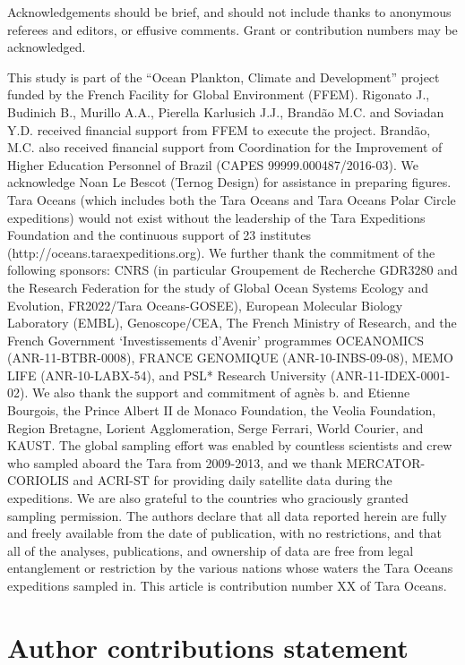 \documentclass[fleqn,10pt]{wlscirep}
\begin{document}
Acknowledgements should be brief, and should not include thanks to anonymous referees and editors, or effusive comments. Grant or contribution numbers may be acknowledged.

This study is part of the “Ocean Plankton, Climate and Development” project funded by the French Facility for Global Environment (FFEM). Rigonato J., Budinich B., Murillo A.A., Pierella Karlusich J.J., Brandão M.C. and Soviadan Y.D. received financial support from FFEM to execute the project. Brandão, M.C. also received financial support from Coordination for the Improvement of Higher Education Personnel of Brazil (CAPES 99999.000487/2016-03). We acknowledge Noan Le Bescot (Ternog Design) for assistance in preparing figures. Tara Oceans (which includes both the Tara Oceans and Tara Oceans Polar Circle expeditions) would not exist without the leadership of the Tara Expeditions Foundation and the continuous support of 23 institutes (http://oceans.taraexpeditions.org). We further thank the commitment of the following sponsors: CNRS (in particular Groupement de Recherche GDR3280 and the Research Federation for the study of Global Ocean Systems Ecology and Evolution, FR2022/Tara Oceans-GOSEE), European Molecular Biology Laboratory (EMBL), Genoscope/CEA, The French Ministry of Research, and the French Government ‘Investissements d’Avenir’ programmes OCEANOMICS (ANR-11-BTBR-0008), FRANCE GENOMIQUE (ANR-10-INBS-09-08), MEMO LIFE (ANR-10-LABX-54), and PSL* Research University (ANR-11-IDEX-0001-02). We also thank the support and commitment of agnès b. and Etienne Bourgois, the Prince Albert II de Monaco Foundation, the Veolia Foundation, Region Bretagne, Lorient Agglomeration, Serge Ferrari, World Courier, and KAUST. The global sampling effort was enabled by countless scientists and crew who sampled aboard the Tara from 2009-2013, and we thank MERCATOR-CORIOLIS and ACRI-ST for providing daily satellite data during the expeditions. We are also grateful to the countries who graciously granted sampling permission. The authors declare that all data reported herein are fully and freely available from the date of publication, with no restrictions, and that all of the analyses, publications, and ownership of data are free from legal entanglement or restriction by the various nations whose waters the Tara Oceans expeditions sampled in. This article is contribution number XX of Tara Oceans.

\section*{Author contributions statement}
\end{document}
